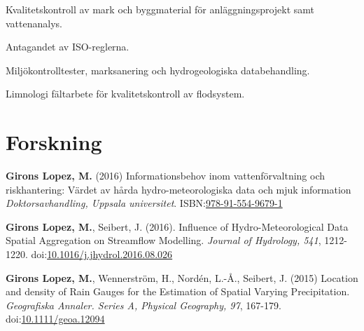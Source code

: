 \documentclass[]{gironslopez-resume-se}
\begin{document}
    \vspace{\topsep}
    \begin{tightemize}
      \item Kvalitetskontroll av mark och byggmaterial för anläggningsprojekt samt vattenanalys.
      \item Antagandet av ISO-reglerna.
    \end{tightemize}

    \sectionsep

    \begin{tightemize}
      \item Miljökontrolltester, marksanering och hydrogeologiska databehandling. 
      \item Limnologi fältarbete för kvalitetskontroll av flodsystem.
    \end{tightemize}

    \sectionsep

    \section{Forskning}
    
    \textbf{Girons Lopez, M.} (2016) Informationsbehov inom vattenförvaltning och riskhantering: Värdet av hårda hydro-meteorologiska data och mjuk information \textit{Doktorsavhandling, Uppsala universitet}. ISBN:\href{http://www.diva-portal.org/smash/record.jsf?pid=diva2\%3A957429\&dswid=-4195}{978-91-554-9679-1}
    
    \sectionsep

    \textbf{Girons Lopez, M.}, Seibert, J. (2016). Influence of Hydro-Meteorological Data Spatial Aggregation on Streamflow Modelling. \textit{Journal of Hydrology, 541}, 1212-1220. doi:\href{http://www.sciencedirect.com/science/article/pii/S0022169416305170}{10.1016/j.jhydrol.2016.08.026}
    
    \sectionsep
    
    \textbf{Girons Lopez, M.}, Wennerstr\"{o}m, H., Nord\'{e}n, L.-\r{A}., Seibert, J. (2015) Location and density of Rain Gauges for the Estimation of Spatial Varying Precipitation. \textit{Geografiska Annaler. Series A, Physical Geography, 97}, 167-179. doi:\href{http://onlinelibrary.wiley.com/doi/10.1111/geoa.12094}{10.1111/geoa.12094}
    
\end{document}
